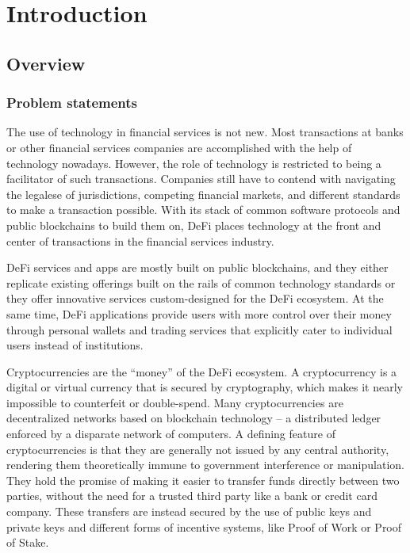 \chapter{Introduction} \label{Introduction}
\minitoc

\section{Overview}

\subsection{Problem statements}

The use of technology in financial services is not new. Most transactions at banks or other financial services companies are accomplished with the help of technology nowadays. However, the role of technology is restricted to being a facilitator of such transactions. Companies still have to contend with navigating the legalese of jurisdictions, competing financial markets, and different standards to make a transaction possible. With its stack of common software protocols and public blockchains to build them on, DeFi places technology at the front and center of transactions in the financial services industry.

DeFi services and apps are mostly built on public blockchains, and they either replicate existing offerings built on the rails of common technology standards or they offer innovative services custom-designed for the DeFi ecosystem. At the same time, DeFi applications provide users with more control over their money through personal wallets and trading services that explicitly cater to individual users instead of institutions.

Cryptocurrencies are the “money” of the DeFi ecosystem. A cryptocurrency is a digital or virtual currency that is secured by cryptography, which makes it nearly impossible to counterfeit or double-spend. Many cryptocurrencies are decentralized networks based on blockchain technology – a distributed ledger enforced by a disparate network of computers. A defining feature of cryptocurrencies is that they are generally not issued by any central authority, rendering them theoretically immune to government interference or manipulation. They hold the promise of making it easier to transfer funds directly between two parties, without the need for a trusted third party like a bank or credit card company. These transfers are instead secured by the use of public keys and private keys and different forms of incentive systems, like Proof of Work or Proof of Stake.

